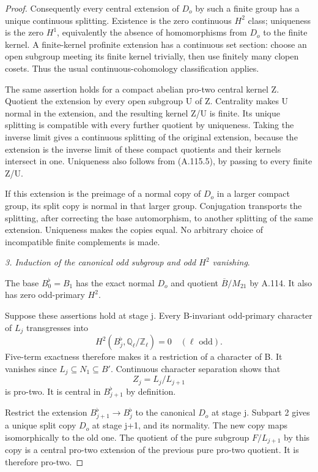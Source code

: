 \begin{proof}
Consequently every central extension of \(D_o\) by such a finite group has a unique continuous splitting. Existence is the zero continuous \(H^2\) class; uniqueness is the zero \(H^1\), equivalently the absence of homomorphisms from \(D_o\) to the finite kernel. A finite-kernel profinite extension has a continuous set section: choose an open subgroup meeting its finite kernel trivially, then use finitely many clopen cosets. Thus the usual continuous-cohomology classification applies.

The same assertion holds for a compact abelian pro-two central kernel Z. Quotient the extension by every open subgroup U of Z. Centrality makes U normal in the extension, and the resulting kernel Z/U is finite. Its unique splitting is compatible with every further quotient by uniqueness. Taking the inverse limit gives a continuous splitting of the original extension, because the extension is the inverse limit of these compact quotients and their kernels intersect in one. Uniqueness also follows from (A.115.5), by passing to every finite Z/U.

If this extension is the preimage of a normal copy of \(D_o\) in a larger compact group, its split copy is normal in that larger group. Conjugation transports the splitting, after correcting the base automorphism, to another splitting of the same extension. Uniqueness makes the copies equal. No arbitrary choice of incompatible finite complements is made.

\medskip\noindent\emph{3. Induction of the canonical odd subgroup and odd \(H^2\) vanishing}.

The base \(B_0^\flat=B_1\) has the exact normal \(D_o\) and quotient \(\overline B/M_{21}\) by A.114. It also has zero odd-primary \(H^2\).

Suppose these assertions hold at stage j. Every B-invariant odd-primary character of \(L_j\) transgresses into
\[
H^2(B_j^\flat,\mathbb Q_\ell/\mathbb Z_\ell)=0
\quad(\ell\text{ odd}).
\]
Five-term exactness therefore makes it a restriction of a character of B. It vanishes since \(L_j\subseteq N_1\subseteq B'\). Continuous character separation shows that
\[
Z_j=L_j/L_{j+1}
\]
is pro-two. It is central in \(B_{j+1}^\flat\) by definition.

Restrict the extension \(B_{j+1}^\flat\to B_j^\flat\) to the canonical \(D_o\) at stage j. Subpart 2 gives a unique split copy \(D_o\) at stage j+1, and its normality. The new copy maps isomorphically to the old one. The quotient of the pure subgroup \(F/L_{j+1}\) by this copy is a central pro-two extension of the previous pure pro-two quotient. It is therefore pro-two.


\end{proof}
